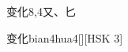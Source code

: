 \begin{entry}{变化}{8,4}{⼜、⼔}
  \begin{phonetics}{变化}{bian4hua4}[][HSK 3]
  \end{phonetics}
\end{entry}
